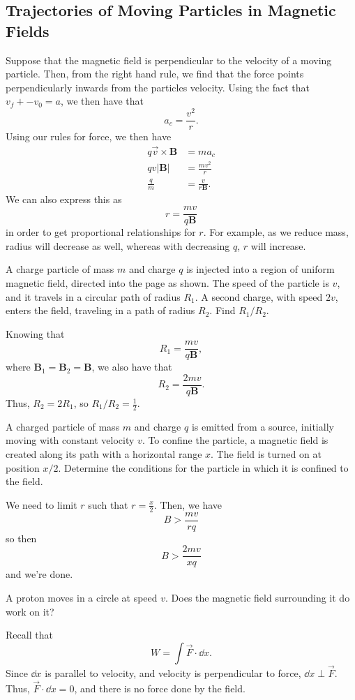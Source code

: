 \documentclass[11pt]{article}
\begin{document}
\subsection{Trajectories of Moving Particles in Magnetic Fields}
Suppose that the magnetic field is perpendicular to the velocity of a moving particle. Then, from the right hand rule, we find that the force points perpendicularly inwards from the particles velocity. Using the fact that $v_f + -v_0 = a$, we then have that
\[a_c = \frac{v^2}{r}.\]
Using our rules for force, we then have
\begin{align*}
    q\vec{v} \times \mathbf{B} &= ma_c \\
    qv|\mathbf{B}| &= \frac{mv^2}{r} \\
    \frac{q}{m} &= \frac{v}{r\mathbf{B}}.
\end{align*}
We can also express this as
\[r = \frac{mv}{q\mathbf{B}}\]
in order to get proportional relationships for $r$. For example, as we reduce mass, radius will decrease as well, whereas with decreasing $q$, $r$ will increase.
\begin{example}
    A charge particle of mass $m$ and charge $q$ is injected into a region of uniform magnetic field, directed into the page as shown. The speed of the particle is $v$, and it travels in a circular path of radius $R_1$. A second charge, with speed $2v$, enters the field, traveling in a path of radius $R_2$. Find $R_1/R_2$.    
\end{example}
\begin{solution}
    Knowing that
    \[R_1 = \frac{mv}{q\mathbf{B}},\]
    where $\mathbf{B}_1 = \mathbf{B}_2 = \mathbf{B}$, we also have that
    \[R_2 = \frac{2mv}{q\mathbf{B}}.\]
    Thus, $R_2 = 2R_1$, so $R_1/R_2 = \boxed{\frac{1}{2}}$.
\end{solution}
\begin{example}
    A charged particle of mass $m$ and charge $q$ is emitted from a source, initially moving with constant velocity $v$. To confine the particle, a magnetic field is created along its path with a horizontal range $x$. The field is turned on at position $x/2$. Determine the conditions for the particle in which it is confined to the field.    
\end{example}
\begin{solution}
    We need to limit $r$ such that $r = \frac{x}{2}$. Then, we have
    \[B > \frac{mv}{rq}\]
    so then
    \[\boxed{B > \frac{2mv}{xq}}\]
    and we're done.
\end{solution}
\begin{example}
    A proton moves in a circle at speed $v$. Does the magnetic field surrounding it do work on it?    
\end{example}
\begin{solution}
    Recall that
    \[W = \int \vec{F}\cdot \dd x.\]
    Since $\dd x$ is parallel to velocity, and velocity is perpendicular to force, $\dd x \perp \vec{F}$. Thus, $\vec{F} \cdot \dd x = 0$, and there is no force done by the field.
\end{solution}
\end{document}

